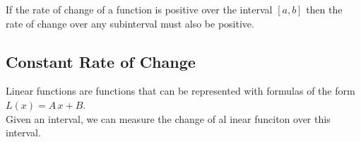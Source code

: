 \documentclass{ximera}
\begin{document}
\begin{question}
If the rate of change of a function is positive over the interval $[a,b]$ then the rate of change over any subinterval must also be positive.
    \begin{multipleChoice}
    \end{multipleChoice}
\end{question}



\subsection*{Constant Rate of Change}


Linear functions are functions that can be represented with formulas of the form $L(x) = A \, x + B$. \\


Given an interval, we can measure the change of al inear funciton over this interval. \\
\end{document}
